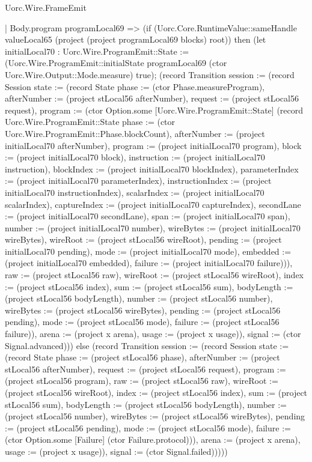\begin{lexlean}{Uorc.Wire.FrameEmit}
\begin{semanticmodule}
{            | Body.program programLocal69 => (if (Uorc.Core.RuntimeValue::sameHandle valueLocal65 (project (project programLocal69 blocks) root)) then (let initialLocal70 : Uorc.Wire.ProgramEmit::State := (Uorc.Wire.ProgramEmit::initialState programLocal69 (ctor Uorc.Wire.Output::Mode.measure) true); (record Transition {session := (record Session {state := (record State {phase := (ctor Phase.measureProgram), afterNumber := (project stLocal56 afterNumber), request := (project stLocal56 request), program := (ctor Option.some [Uorc.Wire.ProgramEmit::State] (record Uorc.Wire.ProgramEmit::State {phase := (ctor Uorc.Wire.ProgramEmit::Phase.blockCount), afterNumber := (project initialLocal70 afterNumber), program := (project initialLocal70 program), block := (project initialLocal70 block), instruction := (project initialLocal70 instruction), blockIndex := (project initialLocal70 blockIndex), parameterIndex := (project initialLocal70 parameterIndex), instructionIndex := (project initialLocal70 instructionIndex), scalarIndex := (project initialLocal70 scalarIndex), captureIndex := (project initialLocal70 captureIndex), secondLane := (project initialLocal70 secondLane), span := (project initialLocal70 span), number := (project initialLocal70 number), wireBytes := (project initialLocal70 wireBytes), wireRoot := (project stLocal56 wireRoot), pending := (project initialLocal70 pending), mode := (project initialLocal70 mode), embedded := (project initialLocal70 embedded), failure := (project initialLocal70 failure)})), raw := (project stLocal56 raw), wireRoot := (project stLocal56 wireRoot), index := (project stLocal56 index), sum := (project stLocal56 sum), bodyLength := (project stLocal56 bodyLength), number := (project stLocal56 number), wireBytes := (project stLocal56 wireBytes), pending := (project stLocal56 pending), mode := (project stLocal56 mode), failure := (project stLocal56 failure)}), arena := (project x arena), usage := (project x usage)}), signal := (ctor Signal.advanced)})) else (record Transition {session := (record Session {state := (record State {phase := (project stLocal56 phase), afterNumber := (project stLocal56 afterNumber), request := (project stLocal56 request), program := (project stLocal56 program), raw := (project stLocal56 raw), wireRoot := (project stLocal56 wireRoot), index := (project stLocal56 index), sum := (project stLocal56 sum), bodyLength := (project stLocal56 bodyLength), number := (project stLocal56 number), wireBytes := (project stLocal56 wireBytes), pending := (project stLocal56 pending), mode := (project stLocal56 mode), failure := (ctor Option.some [Failure] (ctor Failure.protocol))}), arena := (project x arena), usage := (project x usage)}), signal := (ctor Signal.failed)}))))
}
\end{semanticmodule}
\end{lexlean}
